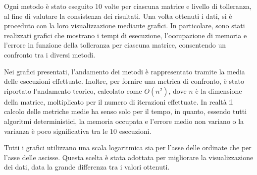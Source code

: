 Ogni metodo è stato eseguito 10 volte per ciascuna matrice e livello di tolleranza,
al fine di valutare la consistenza dei risultati. Una volta ottenuti i dati, si è
proceduto con la loro visualizzazione mediante grafici. In particolare, sono stati
realizzati grafici che mostrano i tempi di esecuzione, l'occupazione di memoria
e l'errore in funzione della tolleranza per ciascuna matrice, consentendo un confronto tra
i diversi metodi.

Nei grafici presentati, l'andamento dei metodi è rappresentato tramite la media
delle esecuzioni effettuate. Inoltre, per fornire una metrica di confronto, è
stato riportato l'andamento teorico, calcolato come $O(n^2)$, dove $n$ è la
dimensione della matrice, moltiplicato per il numero di iterazioni effettuate.
In realtà il calcolo delle metriche medie ha senso solo per il
tempo, in quanto, essendo tutti algoritmi deterministici, la memoria occupata e
l'errore medio non variano o la varianza è poco significativa tra le $10$ esecuzioni.

Tutti i grafici utilizzano una scala logaritmica sia per l'asse delle ordinate
che per l'asse delle ascisse. Questa scelta è stata adottata per migliorare la
visualizzazione dei dati, data la grande differenza tra i valori ottenuti.

